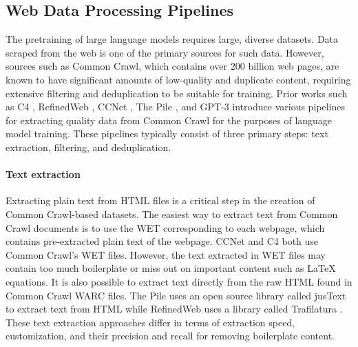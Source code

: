 \subsection{Web Data Processing Pipelines} The pretraining of large language models requires large, diverse datasets. Data scraped from the web is one of the primary sources for such data. However, sources such as Common Crawl, which contains over 200 billion web pages, are known to have significant amounts of low-quality and duplicate content, requiring extensive filtering and deduplication to be suitable for training. Prior works such as C4 \citep{raffel2020exploring}, RefinedWeb \citep{refined-web}, CCNet \citep{wenzek2019ccnet}, The Pile \citep{gao2020pile}, and GPT-3 \citep{gpt3} introduce various pipelines for extracting quality data from Common Crawl for the purposes of language model training. These pipelines typically consist of three primary steps: text extraction, filtering, and deduplication.

\paragraph{Text extraction} Extracting plain text from HTML files is a critical step in the creation of Common Crawl-based datasets. The easiest way to extract text from Common Crawl documents is to use the WET corresponding to each webpage, which contains pre-extracted plain text of the webpage. CCNet and C4 both use Common Crawl's WET files. However, the text extracted in WET files may contain too much boilerplate or miss out on important content such as \LaTeX{} equations. It is also possible to extract text directly from the raw HTML found in Common Crawl WARC files. The Pile uses an open source library called jusText \citep{justext} to extract text from HTML while RefinedWeb uses a library called Trafilatura \citep{barbaresi-2021-trafilatura}. These text extraction approaches differ in terms of extraction speed, customization, and their precision and recall for removing boilerplate content.

